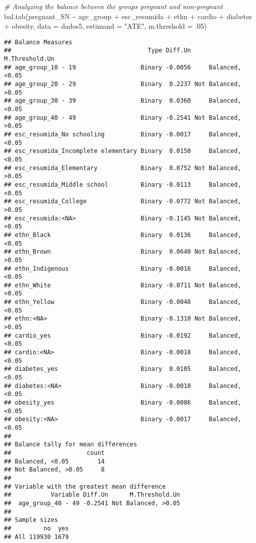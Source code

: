 \documentclass[
]{article}
\newenvironment{Shaded}{\begin{snugshade}}{\end{snugshade}}
\newcommand{\AttributeTok}[1]{\textcolor[rgb]{0.77,0.63,0.00}{#1}}
\newcommand{\CommentTok}[1]{\textcolor[rgb]{0.56,0.35,0.01}{\textit{#1}}}
\newcommand{\DecValTok}[1]{\textcolor[rgb]{0.00,0.00,0.81}{#1}}
\newcommand{\FunctionTok}[1]{\textcolor[rgb]{0.00,0.00,0.00}{#1}}
\newcommand{\NormalTok}[1]{#1}
\newcommand{\SpecialCharTok}[1]{\textcolor[rgb]{0.00,0.00,0.00}{#1}}
\newcommand{\StringTok}[1]{\textcolor[rgb]{0.31,0.60,0.02}{#1}}
\begin{document}
\begin{Shaded}
\begin{Highlighting}[]
\CommentTok{\# Analyzing the balance between the groups pregnant and non{-}pregnant}
\FunctionTok{bal.tab}\NormalTok{(pregnant\_SN }\SpecialCharTok{\textasciitilde{}}\NormalTok{ age\_group }\SpecialCharTok{+}\NormalTok{ esc\_resumida }\SpecialCharTok{+}\NormalTok{ ethn }\SpecialCharTok{+}\NormalTok{ cardio }\SpecialCharTok{+}\NormalTok{ diabetes }\SpecialCharTok{+}\NormalTok{ obesity, }
        \AttributeTok{data =}\NormalTok{ dados5, }\AttributeTok{estimand =} \StringTok{"ATE"}\NormalTok{, }\AttributeTok{m.threshold =}\NormalTok{ .}\DecValTok{05}\NormalTok{)}
\end{Highlighting}
\end{Shaded}

\begin{verbatim}
## Balance Measures
##                                      Type Diff.Un      M.Threshold.Un
## age_group_10 - 19                  Binary -0.0056     Balanced, <0.05
## age_group_20 - 29                  Binary  0.2237 Not Balanced, >0.05
## age_group_30 - 39                  Binary  0.0360     Balanced, <0.05
## age_group_40 - 49                  Binary -0.2541 Not Balanced, >0.05
## esc_resumida_No schooling          Binary -0.0017     Balanced, <0.05
## esc_resumida_Incomplete elementary Binary  0.0150     Balanced, <0.05
## esc_resumida_Elementary            Binary  0.0752 Not Balanced, >0.05
## esc_resumida_Middle school         Binary -0.0113     Balanced, <0.05
## esc_resumida_College               Binary -0.0772 Not Balanced, >0.05
## esc_resumida:<NA>                  Binary -0.1145 Not Balanced, >0.05
## ethn_Black                         Binary  0.0136     Balanced, <0.05
## ethn_Brown                         Binary  0.0640 Not Balanced, >0.05
## ethn_Indigenous                    Binary -0.0016     Balanced, <0.05
## ethn_White                         Binary -0.0711 Not Balanced, >0.05
## ethn_Yellow                        Binary -0.0048     Balanced, <0.05
## ethn:<NA>                          Binary -0.1310 Not Balanced, >0.05
## cardio_yes                         Binary -0.0192     Balanced, <0.05
## cardio:<NA>                        Binary -0.0018     Balanced, <0.05
## diabetes_yes                       Binary  0.0105     Balanced, <0.05
## diabetes:<NA>                      Binary -0.0018     Balanced, <0.05
## obesity_yes                        Binary -0.0086     Balanced, <0.05
## obesity:<NA>                       Binary -0.0017     Balanced, <0.05
## 
## Balance tally for mean differences
##                     count
## Balanced, <0.05        14
## Not Balanced, >0.05     8
## 
## Variable with the greatest mean difference
##           Variable Diff.Un      M.Threshold.Un
##  age_group_40 - 49 -0.2541 Not Balanced, >0.05
## 
## Sample sizes
##         no  yes
## All 119930 1679
\end{verbatim}
\end{document}
